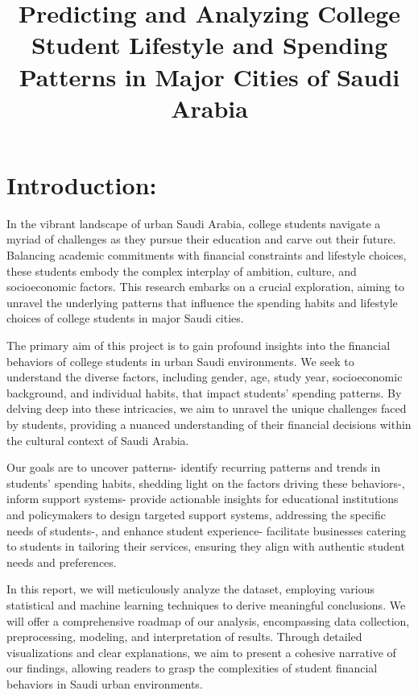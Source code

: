 \documentclass[
]{article}
\title{Predicting and Analyzing College Student Lifestyle and Spending
Patterns in Major Cities of Saudi Arabia}
\author{}
\date{\vspace{-2.5em}}
\begin{document}
\maketitle

{
\setcounter{tocdepth}{3}
\tableofcontents
}
\hypertarget{introduction}{%
\section{Introduction:}\label{introduction}}

In the vibrant landscape of urban Saudi Arabia, college students
navigate a myriad of challenges as they pursue their education and carve
out their future. Balancing academic commitments with financial
constraints and lifestyle choices, these students embody the complex
interplay of ambition, culture, and socioeconomic factors. This research
embarks on a crucial exploration, aiming to unravel the underlying
patterns that influence the spending habits and lifestyle choices of
college students in major Saudi cities.

The primary aim of this project is to gain profound insights into the
financial behaviors of college students in urban Saudi environments. We
seek to understand the diverse factors, including gender, age, study
year, socioeconomic background, and individual habits, that impact
students' spending patterns. By delving deep into these intricacies, we
aim to unravel the unique challenges faced by students, providing a
nuanced understanding of their financial decisions within the cultural
context of Saudi Arabia.

Our goals are to uncover patterns- identify recurring patterns and
trends in students' spending habits, shedding light on the factors
driving these behaviors-, inform support systems- provide actionable
insights for educational institutions and policymakers to design
targeted support systems, addressing the specific needs of students-,
and enhance student experience- facilitate businesses catering to
students in tailoring their services, ensuring they align with authentic
student needs and preferences.

In this report, we will meticulously analyze the dataset, employing
various statistical and machine learning techniques to derive meaningful
conclusions. We will offer a comprehensive roadmap of our analysis,
encompassing data collection, preprocessing, modeling, and
interpretation of results. Through detailed visualizations and clear
explanations, we aim to present a cohesive narrative of our findings,
allowing readers to grasp the complexities of student financial
behaviors in Saudi urban environments.
\end{document}
